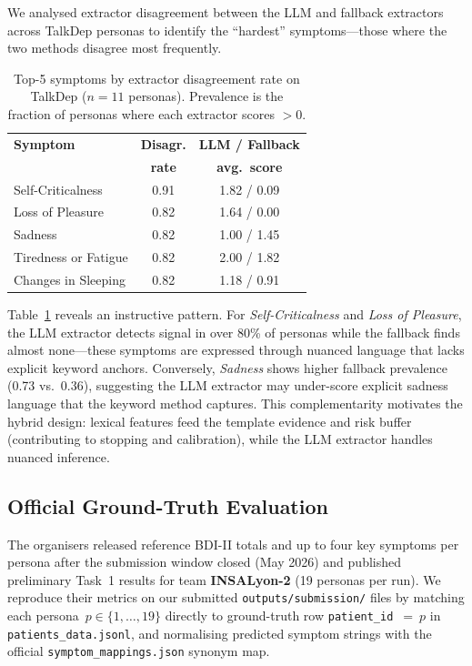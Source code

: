 \documentclass[]{ceurart}
\begin{document}
We analysed extractor disagreement between the LLM and fallback extractors across TalkDep personas to identify the ``hardest'' symptoms---those where the two methods disagree most frequently.

\begin{table}[t]
\caption{Top-5 symptoms by extractor disagreement rate on TalkDep ($n = 11$ personas). Prevalence is the fraction of personas where each extractor scores $> 0$.}
\label{tab:difficulty}
\centering
\small
\begin{tabular}{lcc}
\toprule
\textbf{Symptom} & \textbf{Disagr.} & \textbf{LLM / Fallback} \\
  & \textbf{rate} & \textbf{avg.\ score} \\
\midrule
Self-Criticalness        & 0.91 & 1.82 / 0.09 \\
Loss of Pleasure         & 0.82 & 1.64 / 0.00 \\
Sadness                  & 0.82 & 1.00 / 1.45 \\
Tiredness or Fatigue     & 0.82 & 2.00 / 1.82 \\
Changes in Sleeping      & 0.82 & 1.18 / 0.91 \\
\bottomrule
\end{tabular}
\end{table}

Table~\ref{tab:difficulty} reveals an instructive pattern.
For \emph{Self-Criticalness} and \emph{Loss of Pleasure}, the LLM extractor detects signal in over 80\% of personas while the fallback finds almost none---these symptoms are expressed through nuanced language that lacks explicit keyword anchors.
Conversely, \emph{Sadness} shows higher fallback prevalence (0.73 vs.\ 0.36), suggesting the LLM extractor may under-score explicit sadness language that the keyword method captures.
This complementarity motivates the hybrid design: lexical features feed the template evidence and risk buffer (contributing to stopping and calibration), while the LLM extractor handles nuanced inference.


\subsection{Official Ground-Truth Evaluation}\label{sec:gt-eval}

The organisers released reference BDI-II totals and up to four key symptoms per persona after the submission window closed (May 2026) and published preliminary Task~1 results for team \textbf{INSALyon-2} (19 personas per run).
We reproduce their metrics on our submitted \texttt{outputs/submission/} files by matching each persona~$p \in \{1,\ldots,19\}$ directly to ground-truth row \texttt{patient\_id}~$=~p$ in \texttt{patients\_data.jsonl}, and normalising predicted symptom strings with the official \texttt{symptom\_mappings.json} synonym map.
\end{document}
